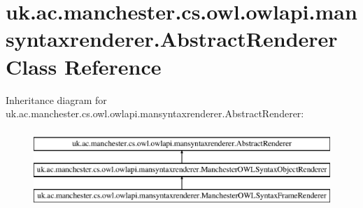 \hypertarget{classuk_1_1ac_1_1manchester_1_1cs_1_1owl_1_1owlapi_1_1mansyntaxrenderer_1_1_abstract_renderer}{\section{uk.\-ac.\-manchester.\-cs.\-owl.\-owlapi.\-mansyntaxrenderer.\-Abstract\-Renderer Class Reference}
\label{classuk_1_1ac_1_1manchester_1_1cs_1_1owl_1_1owlapi_1_1mansyntaxrenderer_1_1_abstract_renderer}
}
Inheritance diagram for uk.\-ac.\-manchester.\-cs.\-owl.\-owlapi.\-mansyntaxrenderer.\-Abstract\-Renderer\-:\begin{figure}[H]
\begin{center}
\leavevmode
\includegraphics[height=3.000000cm]{classuk_1_1ac_1_1manchester_1_1cs_1_1owl_1_1owlapi_1_1mansyntaxrenderer_1_1_abstract_renderer}
\end{center}
\end{figure}

